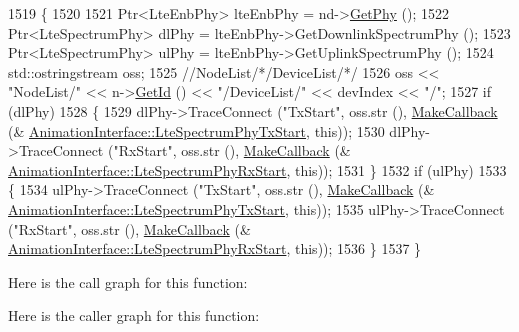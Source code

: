 \begin{DoxyCode}
1519 \{
1520 
1521   Ptr<LteEnbPhy> lteEnbPhy = nd->\hyperlink{classns3_1_1LteEnbNetDevice_a58db72130e0740f16a5e03b22e4a10a4}{GetPhy} ();
1522   Ptr<LteSpectrumPhy> dlPhy = lteEnbPhy->GetDownlinkSpectrumPhy ();
1523   Ptr<LteSpectrumPhy> ulPhy = lteEnbPhy->GetUplinkSpectrumPhy ();
1524   std::ostringstream oss;
1525   \textcolor{comment}{//NodeList/*/DeviceList/*/}
1526   oss << \textcolor{stringliteral}{"NodeList/"} << n->\hyperlink{classns3_1_1Node_aaf49b64a843565ce3812326313b370ac}{GetId} () << \textcolor{stringliteral}{"/DeviceList/"} << devIndex << \textcolor{stringliteral}{"/"};
1527   \textcolor{keywordflow}{if} (dlPhy)
1528     \{
1529       dlPhy->TraceConnect (\textcolor{stringliteral}{"TxStart"}, oss.str (), \hyperlink{group__makecallbackmemptr_ga9376283685aa99d204048d6a4b7610a4}{MakeCallback} (&
      \hyperlink{classns3_1_1AnimationInterface_a3f0131dc28ccba541c2ef52bbc920e62}{AnimationInterface::LteSpectrumPhyTxStart}, \textcolor{keyword}{this}));
1530       dlPhy->TraceConnect (\textcolor{stringliteral}{"RxStart"}, oss.str (), \hyperlink{group__makecallbackmemptr_ga9376283685aa99d204048d6a4b7610a4}{MakeCallback} (&
      \hyperlink{classns3_1_1AnimationInterface_a476014043547ee8c36cdbd92324c938f}{AnimationInterface::LteSpectrumPhyRxStart}, \textcolor{keyword}{this}));
1531     \}
1532   \textcolor{keywordflow}{if} (ulPhy)
1533     \{
1534       ulPhy->TraceConnect (\textcolor{stringliteral}{"TxStart"}, oss.str (), \hyperlink{group__makecallbackmemptr_ga9376283685aa99d204048d6a4b7610a4}{MakeCallback} (&
      \hyperlink{classns3_1_1AnimationInterface_a3f0131dc28ccba541c2ef52bbc920e62}{AnimationInterface::LteSpectrumPhyTxStart}, \textcolor{keyword}{this}));
1535       ulPhy->TraceConnect (\textcolor{stringliteral}{"RxStart"}, oss.str (), \hyperlink{group__makecallbackmemptr_ga9376283685aa99d204048d6a4b7610a4}{MakeCallback} (&
      \hyperlink{classns3_1_1AnimationInterface_a476014043547ee8c36cdbd92324c938f}{AnimationInterface::LteSpectrumPhyRxStart}, \textcolor{keyword}{this}));
1536     \}
1537 \}
\end{DoxyCode}


Here is the call graph for this function\+:




Here is the caller graph for this function\+:



